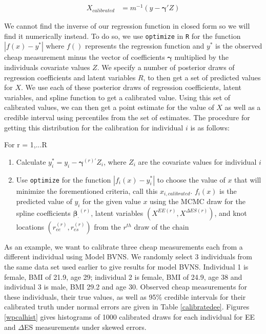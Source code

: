 \documentclass[11pt]{article}\usepackage[]{graphicx}\usepackage[]{color}
\begin{document}
\begin{align}
  X_{calibrated} &= m^{-1}(y-\boldsymbol{\gamma}' Z) 
\end{align}

We cannot find the inverse of our regression function in closed form so we will find it numerically instead. To do so, we use \texttt{optimize} in \texttt{R} for the function $|f(x)-y^*|$ where $f()$ represents the regression function and $y^*$ is the observed cheap measurement minus the vector of coefficients $\boldsymbol{\gamma}$ multiplied by the individuals covariate values $Z$. We specify a number of posterior draws of regression coefficients and latent variables $R$, to then get a set of predicted values for $X$. We use each of these posterior draws of regression coefficients, latent variables, and spline function to get a calibrated value. Using this set of calibrated values, we can then get a point estimate for the value of $X$ as well as a credible interval using percentiles from the set of estimates. The procedure for getting this distribution for the calibration for individual $i$ is as follows:

For r = 1,...R
\begin{enumerate}
\item
Calculate $y_i^* = y_i- \boldsymbol{\gamma}^{(r)'} Z_i$, where $Z_i$ are the covariate values for individual $i$
\item
Use \texttt{optimize} for the function $|f_i(x) - y_i^*|$ to choose the value of $x$ that will minimize the forementioned criteria, call this $x_{i,calibrated}$. $f_i(x)$ is the predicted value of $y_i$ for the given value $x$ using the MCMC draw for the spline coefficients $\boldsymbol{\beta_{\cdot}}^{(r)}$, latent variables $({ X^{EE(r)},X^{\Delta ES (r)}})$, and knot locations $(r_{ee}^{(r)},r_{es}^{(r)})$ from the $r^{th}$ draw of the chain

\end{enumerate}


As an example, we want to calibrate three cheap measurements each from a different individual using Model BVNS. We randomly select 3 individuals from the same data set used earlier to give results for model BVNS. Individual 1 is female, BMI of 21.9, age 29; individual 2 is female, BMI of 24.9, age 38 and individual 3 is male, BMI 29.2 and age 30. Observed cheap measurements for these individuals, their true values, as well as 95\% credible intervals for their calibrated truth under normal errors are given in Table \ref{calibratedee}. Figures \ref{wpcalhist} gives histograms of 1000 calibrated draws for each individual for EE and $\Delta$ES measurements under skewed errors. 
\end{document}
